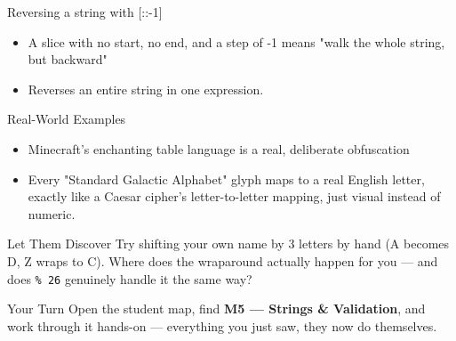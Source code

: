\documentclass[aspectratio=169]{beamer}
\begin{document}
\begin{frame}{Reversing a string with [::-1]}
    \large
    \begin{itemize}
        \item A slice with no start, no end, and a step of -1 means "walk the whole string, but backward"
        \item Reverses an entire string in one expression.
    \end{itemize}
\end{frame}

\begin{frame}{Real-World Examples}
    \large
    \begin{itemize}
        \item Minecraft's enchanting table language is a real, deliberate obfuscation
        \item Every "Standard Galactic Alphabet" glyph maps to a real English letter, exactly like a Caesar cipher's letter-to-letter mapping, just visual instead of numeric.
    \end{itemize}
\end{frame}


\begin{frame}{Let Them Discover}
    \Large
    Try shifting your own name by 3 letters by hand (A becomes D, Z wraps to C). Where does the wraparound actually happen for you — and does \texttt{\% 26} genuinely handle it the same way?
\end{frame}

\begin{frame}{Your Turn}
    \Large
    Open the student map, find \textbf{M5 — Strings \& Validation}, and work through it
    hands-on --- everything you just saw, they now do themselves.
\end{frame}
\end{document}
